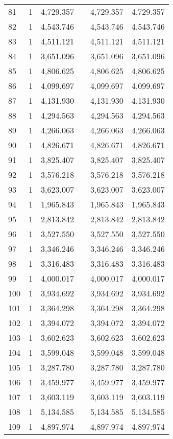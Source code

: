 \begin{table}[!htbp]
\begin{tabular}{@{\extracolsep{5pt}}lccccc}
81 & 1 & 4,729.357 &  & 4,729.357 & 4,729.357 \\ 
82 & 1 & 4,543.746 &  & 4,543.746 & 4,543.746 \\ 
83 & 1 & 4,511.121 &  & 4,511.121 & 4,511.121 \\ 
84 & 1 & 3,651.096 &  & 3,651.096 & 3,651.096 \\ 
85 & 1 & 4,806.625 &  & 4,806.625 & 4,806.625 \\ 
86 & 1 & 4,099.697 &  & 4,099.697 & 4,099.697 \\ 
87 & 1 & 4,131.930 &  & 4,131.930 & 4,131.930 \\ 
88 & 1 & 4,294.563 &  & 4,294.563 & 4,294.563 \\ 
89 & 1 & 4,266.063 &  & 4,266.063 & 4,266.063 \\ 
90 & 1 & 4,826.671 &  & 4,826.671 & 4,826.671 \\ 
91 & 1 & 3,825.407 &  & 3,825.407 & 3,825.407 \\ 
92 & 1 & 3,576.218 &  & 3,576.218 & 3,576.218 \\ 
93 & 1 & 3,623.007 &  & 3,623.007 & 3,623.007 \\ 
94 & 1 & 1,965.843 &  & 1,965.843 & 1,965.843 \\ 
95 & 1 & 2,813.842 &  & 2,813.842 & 2,813.842 \\ 
96 & 1 & 3,527.550 &  & 3,527.550 & 3,527.550 \\ 
97 & 1 & 3,346.246 &  & 3,346.246 & 3,346.246 \\ 
98 & 1 & 3,316.483 &  & 3,316.483 & 3,316.483 \\ 
99 & 1 & 4,000.017 &  & 4,000.017 & 4,000.017 \\ 
100 & 1 & 3,934.692 &  & 3,934.692 & 3,934.692 \\ 
101 & 1 & 3,364.298 &  & 3,364.298 & 3,364.298 \\ 
102 & 1 & 3,394.072 &  & 3,394.072 & 3,394.072 \\ 
103 & 1 & 3,602.623 &  & 3,602.623 & 3,602.623 \\ 
104 & 1 & 3,599.048 &  & 3,599.048 & 3,599.048 \\ 
105 & 1 & 3,287.780 &  & 3,287.780 & 3,287.780 \\ 
106 & 1 & 3,459.977 &  & 3,459.977 & 3,459.977 \\ 
107 & 1 & 3,603.119 &  & 3,603.119 & 3,603.119 \\ 
108 & 1 & 5,134.585 &  & 5,134.585 & 5,134.585 \\ 
109 & 1 & 4,897.974 &  & 4,897.974 & 4,897.974 \\ 

\end{tabular}
\end{table}
